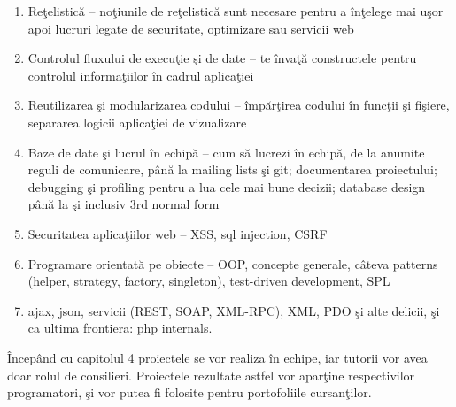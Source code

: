 \begin{enumerate}
\item Reţelistică -- noţiunile de reţelistică sunt necesare pentru a înţelege mai uşor apoi lucruri legate de securitate, optimizare sau servicii web
\item Controlul fluxului de execuţie şi de date -- te învaţă constructele pentru controlul informaţiilor în cadrul aplicaţiei
\item Reutilizarea şi modularizarea codului -- împărţirea codului în funcţii şi fişiere, separarea logicii aplicaţiei de vizualizare
\item Baze de date şi lucrul în echipă -- cum să lucrezi în echipă, de la anumite reguli de comunicare, până la mailing lists şi git; documentarea proiectului; debugging şi profiling pentru a lua cele mai bune decizii; database design până la şi inclusiv 3rd normal form
\item Securitatea aplicaţiilor web -- XSS, sql injection, CSRF
\item Programare orientată pe obiecte -- OOP, concepte generale, câteva patterns (helper, strategy, factory, singleton), test-driven development, SPL
\item ajax, json, servicii (REST, SOAP, XML-RPC), XML, PDO şi alte delicii, şi ca
{\glqq}ultima frontiera{\grqq}: php internals.
\end{enumerate}

Începând cu capitolul 4 proiectele se vor realiza în echipe, iar tutorii vor avea doar rolul de consilieri. Proiectele rezultate astfel vor aparţine respectivilor programatori, şi vor putea fi folosite pentru portofoliile cursanţilor.